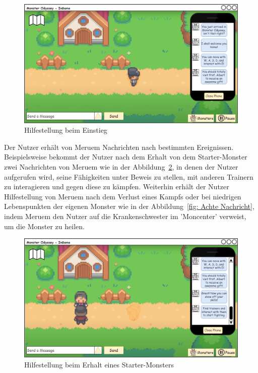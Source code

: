 \begin{figure}[H]
        \center
        \includegraphics[scale=\scale]{images/mockups/Bonusfeatures/Helpsituation/PlayerAndPlayerIngameFourthNotification.png}
        \caption{Hilfestellung beim Einstieg}
        \label{fig: Vierte Nachricht}
\end{figure}
Der Nutzer erhält von Meruem Nachrichten nach bestimmten Ereignissen.
Beispielsweise bekommt der Nutzer nach dem Erhalt von dem Starter-Monster zwei Nachrichten von Meruem wie in der Abbildung~\ref{fig: Sechste Nachricht}, in denen der Nutzer aufgerufen wird, seine Fähigkeiten unter Beweis zu stellen, mit anderen Trainern zu interagieren und gegen diese zu kämpfen.
Weiterhin erhält der Nutzer Hilfestellung von Meruem nach dem Verlust eines Kampfs oder bei niedrigen Lebenspunkten der eigenen Monster wie in der Abbildung~\ref{fig: Achte Nachricht}, indem Meruem den Nutzer auf die Krankenschwester im 'Moncenter' verweist, um die Monster zu heilen.
\begin{figure}[H]
        \center
        \includegraphics[scale=\scale]{images/mockups/Bonusfeatures/Helpsituation/PlayerAndPlayerIngameSixthNotification.png}
        \caption{Hilfestellung beim Erhalt eines Starter-Monsters}
        \label{fig: Sechste Nachricht}
\end{figure}
